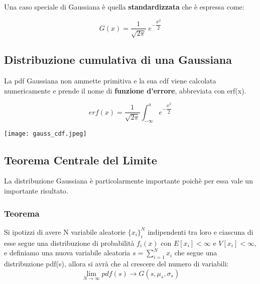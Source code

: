 \documentclass[11pt,a4paper]{book}
\begin{document}
\noindent Una caso speciale di Gaussiana \`{e} quella \textbf{standardizzata} che \`{e} espressa come:

\begin{equation*}
	G(x) = \dfrac{1}{\sqrt{2\pi}}\; e^{-\dfrac{x^2}{2}}
\end{equation*}

\subsection{Distribuzione cumulativa di una Gaussiana}

La pdf Gaussiana non ammette primitiva e la sua cdf viene calcolata numericamente e prende il nome di \textbf{funzione d'errore}, abbreviata con erf(x).

\vspace{0.3in}

  \begin{minipage}{0.5\textwidth}
\begin{equation*}
	erf(x) = \dfrac{1}{\sqrt{2\pi}} \int_{-\infty}^{a}{e^{-\dfrac{x^2}{2}}}
\end{equation*}
  \end{minipage}
  \begin{minipage}{.4\textwidth}
    \centering
    \texttt{[image: gauss\_cdf.jpeg]}

  \end{minipage}
\vspace{0.3in}

\subsection{Teorema Centrale del Limite} 

La distribuzione Gaussiana \`{e} particolarmente importante poich\`{e} per essa vale un importante risultato. 

\subsubsection{Teorema}

Si ipotizzi di avere N variabile aleatorie $\{x_i\}_i^N$ indipendenti tra loro e ciascuna di esse segue una distribuzione di probabilit\`{a} $f_i(x)$ con $E[x_i] < \infty$ e $V[x_i] < \infty$, e definiamo una nuova variabile aleatoria $s = \sum_{i=1}^Nx_{i}$ che segue una distribuzione pdf(s), allora si avr\`{a} che al crescere del numero di variabili:
\begin{equation*}
	\lim_{N \rightarrow \infty} pdf(s) \rightarrow G(s,\mu_s,\sigma_s)
\end{equation*}
\end{document}
